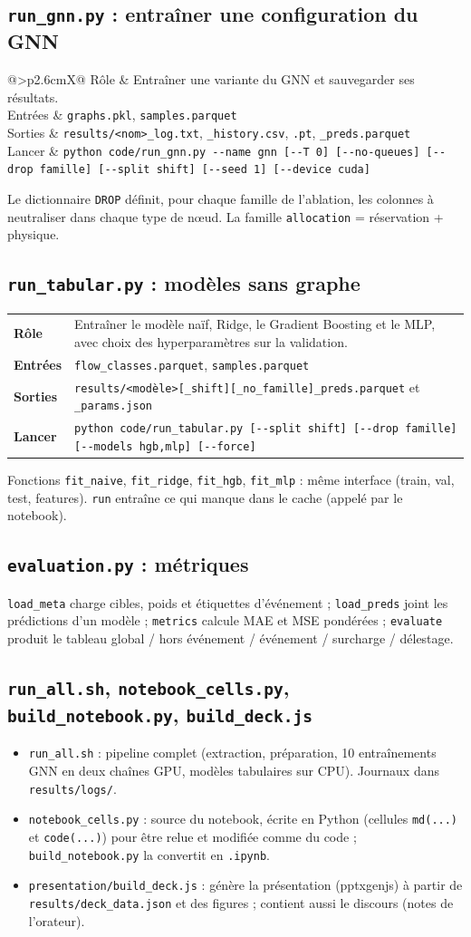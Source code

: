 \documentclass[11pt,a4paper]{article}
\makeatletter
\newcommand{\f}[1]{\texttt{#1}}
\newcommand{\fiche}[4]{%
\noindent\begin{tabularx}{\linewidth}{@{}>{\bfseries}p{2.6cm}X@{}}
\toprule
Rôle & #1\\
Entrées & #2\\
Sorties & #3\\
Lancer & #4\\
\bottomrule
\end{tabularx}\par\medskip}
\makeatother
\begin{document}
\subsection{\texttt{run\_gnn.py} : entraîner une configuration du GNN}
\fiche{Entraîner une variante du GNN et sauvegarder ses résultats.}
{\f{graphs.pkl}, \f{samples.parquet}}
{\f{results/<nom>\_log.txt}, \f{\_history.csv}, \f{.pt}, \f{\_preds.parquet}}
{\f{python code/run\_gnn.py -{}-name gnn [-{}-T 0] [-{}-no-queues] [-{}-drop famille] [-{}-split shift] [-{}-seed 1] [-{}-device cuda]}}
Le dictionnaire \f{DROP} définit, pour chaque famille de l'ablation, les colonnes à neutraliser dans chaque type de nœud. La famille \f{allocation} = réservation + physique.

\subsection{\texttt{run\_tabular.py} : modèles sans graphe}
\fiche{Entraîner le modèle naïf, Ridge, le Gradient Boosting et le MLP, avec choix des hyperparamètres sur la validation.}
{\f{flow\_classes.parquet}, \f{samples.parquet}}
{\f{results/<modèle>[\_shift][\_no\_famille]\_preds.parquet} et \f{\_params.json}}
{\f{python code/run\_tabular.py [-{}-split shift] [-{}-drop famille] [-{}-models hgb,mlp] [-{}-force]}}
Fonctions \f{fit\_naive}, \f{fit\_ridge}, \f{fit\_hgb}, \f{fit\_mlp} : même interface (train, val, test, features). \f{run} entraîne ce qui manque dans le cache (appelé par le notebook).

\subsection{\texttt{evaluation.py} : métriques}
\f{load\_meta} charge cibles, poids et étiquettes d'événement ; \f{load\_preds} joint les prédictions d'un modèle ; \f{metrics} calcule MAE et MSE pondérées ; \f{evaluate} produit le tableau global / hors événement / événement / surcharge / délestage.

\subsection{\texttt{run\_all.sh}, \texttt{notebook\_cells.py}, \texttt{build\_notebook.py}, \texttt{build\_deck.js}}
\begin{itemize}
  \item \f{run\_all.sh} : pipeline complet (extraction, préparation, 10 entraînements GNN en deux chaînes GPU, modèles tabulaires sur CPU). Journaux dans \f{results/logs/}.
  \item \f{notebook\_cells.py} : source du notebook, écrite en Python (cellules \f{md(...)} et \f{code(...)}) pour être relue et modifiée comme du code ; \f{build\_notebook.py} la convertit en \f{.ipynb}.
  \item \f{presentation/build\_deck.js} : génère la présentation (pptxgenjs) à partir de \f{results/deck\_data.json} et des figures ; contient aussi le discours (notes de l'orateur).
\end{itemize}
\end{document}
